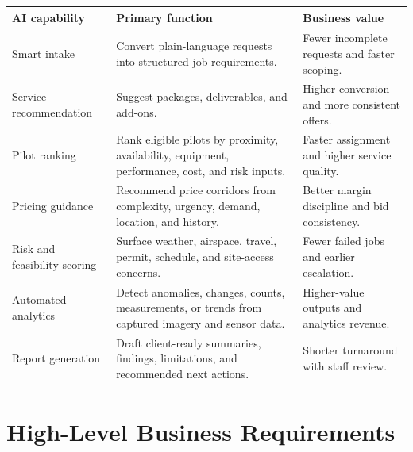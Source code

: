 \documentclass[11pt,a4paper]{article}
\begin{document}
\begin{longtable}{p{}p{}p{}}
\toprule
\textbf{AI capability} & \textbf{Primary function} & \textbf{Business value} \\
\midrule
Smart intake & Convert plain-language requests into structured job requirements. & Fewer incomplete requests and faster scoping. \\
Service recommendation & Suggest packages, deliverables, and add-ons. & Higher conversion and more consistent offers. \\
Pilot ranking & Rank eligible pilots by proximity, availability, equipment, performance, cost, and risk inputs. & Faster assignment and higher service quality. \\
Pricing guidance & Recommend price corridors from complexity, urgency, demand, location, and history. & Better margin discipline and bid consistency. \\
Risk and feasibility scoring & Surface weather, airspace, travel, permit, schedule, and site-access concerns. & Fewer failed jobs and earlier escalation. \\
Automated analytics & Detect anomalies, changes, counts, measurements, or trends from captured imagery and sensor data. & Higher-value outputs and analytics revenue. \\
Report generation & Draft client-ready summaries, findings, limitations, and recommended next actions. & Shorter turnaround with staff review. \\
\bottomrule
\end{longtable}

\section{High-Level Business Requirements}
\end{document}
